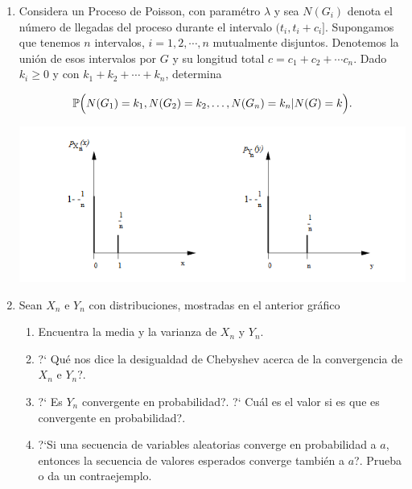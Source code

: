 \documentclass[a4paper,11pt]{report}
\newcommand{\PR}{\mathbb{P}}
\begin{document}
\begin{enumerate}
\begin{enumerate}
	\[
	\PR\Bigl( \Bigl\vert \frac{S_n}{n} - p \Bigr\vert \geq \epsilon\Bigr) \leq \frac{1}{4n\epsilon^2}
	\]
	
	donde $S_n = X_1 + X_2 + \cdots X_n$.
	\item Sea $X$ una variable no negativa. Prueba
	
	\[
	\mathbb{E}(X) \leq [\mathbb{E}(X^2)]^{\frac{1}{2}} \leq [\mathbb{E}(X^3)]^{\frac{1}{3}}\leq \dots
	\]
	
	\item Sea $X$ e $Y$ variables aleatorias independientes, con media $0$ y varianza $1$ y una funci\'on \mbox{generadora} de momentos $M(t)$. Si $X +Y$ y $X -Y$ son independientes, muestra que
	
	\[
	M(2t) = M(t)^3M(-t)
	\]
	
	y deduce que $X$ e $Y$ tienen una distribuci\'on normal con  media $0$ y varianza $1$ .
\end{enumerate}
\item 

Considera un Proceso de Poisson, con param\'etro $\lambda$ y sea $N(G_i)$ denota el n\'umero de llegadas del proceso durante el intervalo $(t_i, t_i + c_i ]$. Supongamos que tenemos $n$ intervalos, $i = 1,2, \cdots, n$ mutualmente disjuntos. Denotemos la uni\'on de esos intervalos por $G$ y su longitud total $c = c_1 + c_2 + \cdots c_n$. Dado $k_i \geq 0$ y con $k_1 + k_2 + \cdots + k_n$, determina

\[
\PR\Bigl( N(G_1)= k_1, N(G_2) = k_2, \dots, N(G_n) = k_n | N(G) = k\Bigr).
\]

\includegraphics[scale=0.8]{p1}

\item  Sean $X_n$ e $Y_n$ con distribuciones, mostradas en el anterior gr\'afico

\begin{enumerate}
	\item Encuentra la media y la varianza de $X_n$ y $Y_n$.
	\item ?` Qu\'e nos dice la desigualdad de Chebyshev acerca de la convergencia de $X_n$ e $Y_n$?.
	\item ?` Es $Y_n$ convergente en probabilidad?. ?` Cu\'al es el valor si es que es convergente en \mbox{probabilidad}?.
	\item ?`Si una secuencia de variables aleatorias converge en probabilidad a $a$, entonces la secuencia de valores esperados converge tambi\'en a $a$?. Prueba o da un contraejemplo.
	

\end{enumerate}
\end{enumerate}
\end{document}
